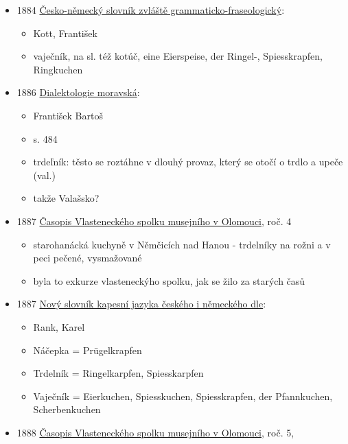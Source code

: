\begin{itemize}
  \begin{itemize}
  \tightlist
  \item
    s. 452
  \item
    Spiesskrapfen = m. vaječník, trdelník
  \end{itemize}
\item
  1884
  \href{https://ndk.cz/uuid/uuid:78814bf1-f124-4c26-99b4-3ce6ef0458ea}{Česko-německý
  slovník zvláště grammaticko-fraseologický}:

  \begin{itemize}
  \tightlist
  \item
    Kott, František
  \item
    vaječník, na sl. též kotúč, eine Eierspeise, der Ringel-,
    Spiesskrapfen, Ringkuchen
  \end{itemize}
\item
  1886
  \href{https://www.google.cz/books/edition/Dialektologie_moravsk\%C3\%A1/IWowAQAAMAAJ?hl=cs&gbpv=1&dq=trdeln\%C3\%ADk&pg=RA1-PA484&printsec=frontcover}{Dialektologie
  moravská}:

  \begin{itemize}
  \tightlist
  \item
    František Bartoš
  \item
    s. 484
  \item
    trdeľník: těsto se roztáhne v dlouhý provaz, který se otočí o trdlo
    a upeče (val.)
  \item
    takže Valašsko?
  \end{itemize}
\item
  1887
  \href{https://ndk.cz/view/uuid:58907250-abd8-11dd-9aac-000d606f5dc6?page=uuid\%3Aadeec330-246a-11e9-bc55-5ef3fc9bb22f&fulltext=trdeln\%C3\%ADky}{Časopis
  Vlasteneckého spolku musejního v Olomouci}, roč. 4

  \begin{itemize}
  \tightlist
  \item
    starohanácká kuchyně v Němčicích nad Hanou - trdelníky na rožni a v
    peci pečené, vysmažované
  \item
    byla to exkurze vlasteneckýho spolku, jak se žilo za starých časů
  \end{itemize}
\item
  1887
  \href{https://ceskadigitalniknihovna.cz/uuid/uuid:cac319e0-dea6-11e6-9964-005056825209}{Nový
  slovník kapesní jazyka českého i německého dle}:

  \begin{itemize}
  \tightlist
  \item
    Rank, Karel
  \item
    Náčepka = Prügelkrapfen
  \item
    Trdelník = Ringelkarpfen, Spiesskarpfen
  \item
    Vaječník = Eierkuchen, Spiesskuchen, Spiesskrapfen, der Pfannkuchen,
    Scherbenkuchen
  \end{itemize}
\item
  1888
  \href{https://ndk.cz/view/uuid:8d89f8c0-abdb-11dd-ae2a-000d606f5dc6?page=uuid\%3Afbdf17f0-247b-11e9-90cf-5ef3fc9bb22f}{Časopis
  Vlasteneckého spolku musejního v Olomouci}, roč. 5,


\end{itemize}
